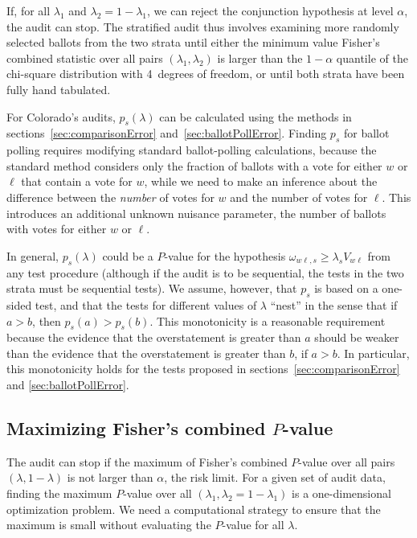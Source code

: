 \documentclass[runningheads]{llncs}
\begin{document}
If, for all $\lambda_1$ and $\lambda_2 = 1- \lambda_1$, we can reject the conjunction
hypothesis at level $\alpha$, the audit can stop.
The stratified audit thus involves examining more randomly selected ballots from the two strata until 
either the minimum value Fisher's combined statistic over all pairs $(\lambda_1, \lambda_2)$ 
is larger than the $1-\alpha$ quantile of the chi-square
distribution with 4~degrees of freedom, or until both strata have been fully hand tabulated.

For Colorado's audits, $p_s(\lambda)$ can be calculated using the methods in 
sections~\ref{sec:comparisonError} and~\ref{sec:ballotPollError}.
Finding $p_s$ for ballot polling requires modifying standard ballot-polling calculations,
because the standard method considers only the fraction of ballots with a vote for either 
$w$ or $\ell$ that contain a vote for $w$, while we need to make an inference about the 
difference between the \emph{number} of votes for $w$ and the number of votes for $\ell$.
This introduces an additional unknown nuisance parameter, the number of ballots with votes for either
$w$ or $\ell$.

In general, $p_s(\lambda)$ could be a $P$-value for the hypothesis
$\omega_{w\ell,s} \ge \lambda_s V_{w\ell}$ from any test procedure (although
if the audit is to be sequential, the tests in the two strata must be sequential tests). 
We assume, however, that $p_s$ is based on a one-sided test, and that the tests
for different values of $\lambda$ ``nest'' in the sense that if $a > b$,
then $p_s(a) > p_s(b)$.
This monotonicity is a reasonable requirement because the evidence that the overstatement
is greater than $a$ should be weaker than the evidence that the overstatement is greater than
$b$, if $a > b$.
In particular, this monotonicity holds for the tests proposed in sections~\ref{sec:comparisonError}
and \ref{sec:ballotPollError}.

\subsection{Maximizing Fisher's combined $P$-value}
The audit can stop if the maximum of Fisher's combined $P$-value over all pairs
$(\lambda, 1-\lambda)$ is not larger than $\alpha$, the risk limit.
For a given set of audit data, 
finding the maximum $P$-value over all $(\lambda_1, \lambda_2 = 1-\lambda_1)$
is a one-dimensional optimization problem.
We need a computational strategy to ensure that the maximum is small
without evaluating the $P$-value for all $\lambda$.
\end{document}
